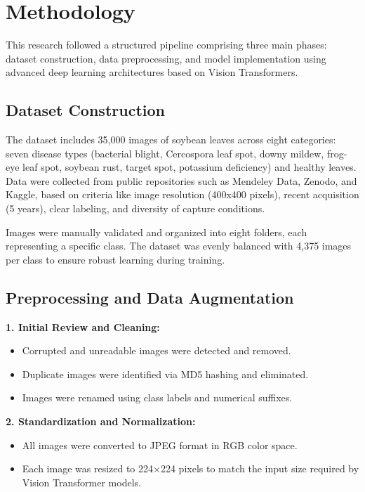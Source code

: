 \documentclass[preprint,12pt]{elsarticle}
\begin{document}
\section{Methodology}

This research followed a structured pipeline comprising three main phases: dataset construction, data preprocessing, and model implementation using advanced deep learning architectures based on Vision Transformers.

\subsection{Dataset Construction}

The dataset includes 35,000 images of soybean leaves across eight categories: seven disease types (bacterial blight, Cercospora leaf spot, downy mildew, frog-eye leaf spot, soybean rust, target spot, potassium deficiency) and healthy leaves. Data were collected from public repositories such as Mendeley Data, Zenodo, and Kaggle, based on criteria like image resolution (400x400 pixels), recent acquisition (5 years), clear labeling, and diversity of capture conditions.

Images were manually validated and organized into eight folders, each representing a specific class. The dataset was evenly balanced with 4,375 images per class to ensure robust learning during training.

\subsection{Preprocessing and Data Augmentation}

\textbf{1. Initial Review and Cleaning:}
\begin{itemize}
  \item Corrupted and unreadable images were detected and removed.
  \item Duplicate images were identified via MD5 hashing and eliminated.
  \item Images were renamed using class labels and numerical suffixes.
\end{itemize}

\textbf{2. Standardization and Normalization:}
\begin{itemize}
  \item All images were converted to JPEG format in RGB color space.
  \item Each image was resized to 224$\times$224 pixels to match the input size required by Vision Transformer models.
\end{itemize}
\end{document}
